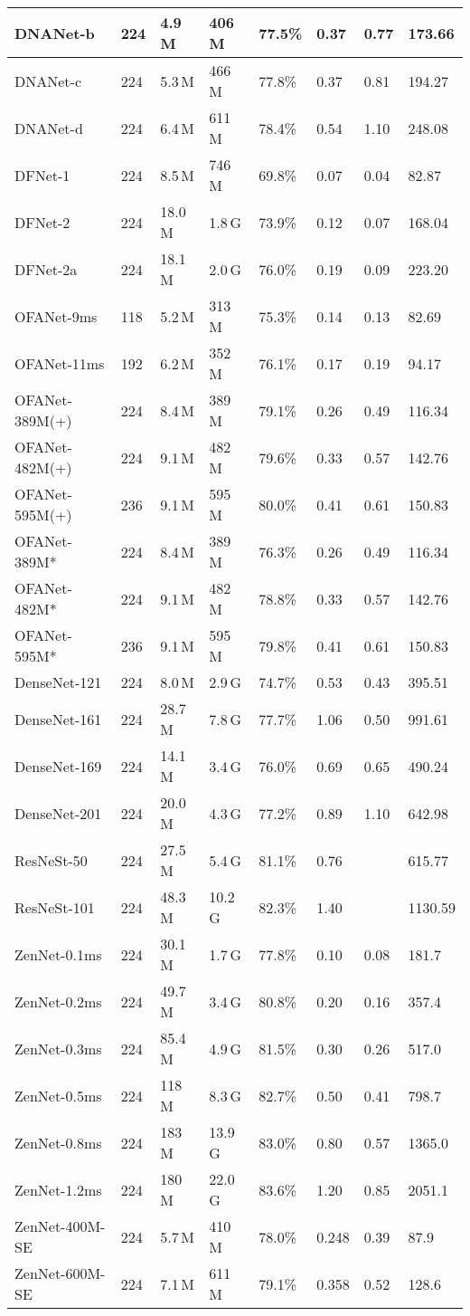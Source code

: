 \documentclass{article}
\providecommand{\tabularnewline}{\\}
\providecommand{\tabularnewline}{\\}
\begin{document}
\begin{longtable}[c]{llllllll}
\midrule 
DNANet-b & 224 & 4.9\,M & 406\,M & 77.5\% & 0.37 & 0.77 & 173.66\tabularnewline
\midrule 
DNANet-c & 224 & 5.3\,M & 466\,M & 77.8\% & 0.37 & 0.81 & 194.27\tabularnewline
\midrule 
DNANet-d & 224 & 6.4\,M & 611\,M & 78.4\% & 0.54 & 1.10 & 248.08\tabularnewline
\midrule 
DFNet-1 & 224 & 8.5\,M & 746\,M & 69.8\% & 0.07 & 0.04 & 82.87\tabularnewline
\midrule 
DFNet-2 & 224 & 18.0\,M & 1.8\,G & 73.9\% & 0.12 & 0.07 & 168.04\tabularnewline
\midrule 
DFNet-2a & 224 & 18.1\,M & 2.0\,G & 76.0\% & 0.19 & 0.09 & 223.20\tabularnewline
\midrule 
OFANet-9ms & 118 & 5.2\,M & 313\,M & 75.3\% & 0.14 & 0.13 & 82.69\tabularnewline
\midrule 
OFANet-11ms & 192 & 6.2\,M & 352\,M & 76.1\% & 0.17 & 0.19 & 94.17\tabularnewline
\midrule 
OFANet-389M(+) & 224 & 8.4\,M & 389\,M & 79.1\% & 0.26 & 0.49 & 116.34\tabularnewline
\midrule 
OFANet-482M(+) & 224 & 9.1\,M & 482\,M & 79.6\% & 0.33 & 0.57 & 142.76\tabularnewline
\midrule 
OFANet-595M(+) & 236 & 9.1\,M & 595\,M & 80.0\% & 0.41 & 0.61 & 150.83\tabularnewline
\midrule 
OFANet-389M{*} & 224 & 8.4\,M & 389\,M & 76.3\% & 0.26 & 0.49 & 116.34\tabularnewline
\midrule 
OFANet-482M{*} & 224 & 9.1\,M & 482\,M & 78.8\% & 0.33 & 0.57 & 142.76\tabularnewline
\midrule 
OFANet-595M{*} & 236 & 9.1\,M & 595\,M & 79.8\% & 0.41 & 0.61 & 150.83\tabularnewline
\midrule 
DenseNet-121 & 224 & 8.0\,M & 2.9\,G & 74.7\% & 0.53 & 0.43 & 395.51\tabularnewline
\midrule 
DenseNet-161 & 224 & 28.7\,M & 7.8\,G & 77.7\% & 1.06 & 0.50 & 991.61\tabularnewline
\midrule 
DenseNet-169 & 224 & 14.1\,M & 3.4\,G & 76.0\% & 0.69 & 0.65 & 490.24\tabularnewline
\midrule 
DenseNet-201 & 224 & 20.0\,M & 4.3\,G & 77.2\% & 0.89 & 1.10 & 642.98\tabularnewline
\midrule 
ResNeSt-50 & 224 & 27.5\,M & 5.4\,G & 81.1\% & 0.76 &  & 615.77\tabularnewline
\midrule 
ResNeSt-101 & 224 & 48.3\,M & 10.2\,G & 82.3\% & 1.40 &  & 1130.59\tabularnewline
\midrule 
ZenNet-0.1ms & 224 & 30.1\,M & 1.7\,G & 77.8\% & 0.10 & 0.08 & 181.7 \tabularnewline
\midrule 
ZenNet-0.2ms & 224 & 49.7\,M & 3.4\,G & 80.8\% & 0.20 & 0.16 & 357.4 \tabularnewline
\midrule 
ZenNet-0.3ms & 224 & 85.4\,M & 4.9\,G & 81.5\% & 0.30 & 0.26 & 517.0 \tabularnewline
\midrule 
ZenNet-0.5ms & 224 & 118\,M & 8.3\,G & 82.7\% & 0.50 & 0.41 & 798.7 \tabularnewline
\midrule 
ZenNet-0.8ms & 224 & 183\,M & 13.9\,G & 83.0\% & 0.80 & 0.57 & 1365.0 \tabularnewline
\midrule 
ZenNet-1.2ms & 224 & 180\,M & 22.0\,G & 83.6\% & 1.20 & 0.85 & 2051.1 \tabularnewline
\midrule 
ZenNet-400M-SE & 224 & 5.7\,M & 410\,M & 78.0\% & 0.248 & 0.39 & 87.9 \tabularnewline
\midrule 
ZenNet-600M-SE & 224 & 7.1\,M & 611\,M & 79.1\% & 0.358 & 0.52 & 128.6 \tabularnewline

\end{longtable}
\end{document}

